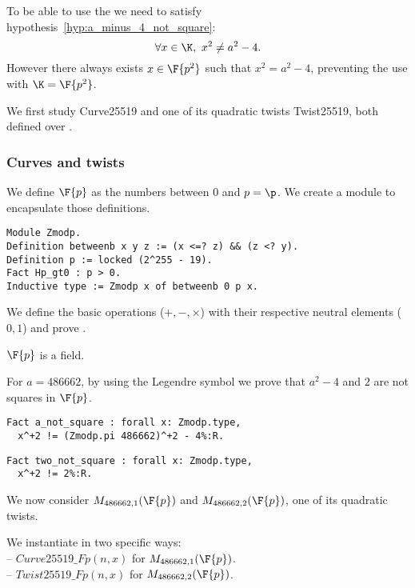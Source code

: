 To be able to use the  we need to satisfy
hypothesis~\ref{hyp:a_minus_4_not_square}:%
$$\forall x \in \K,\ x^2 \neq a^2-4.$$
However there always exists $x \in \F{p^2}$ such that $x^2 = a^2-4$,
preventing the use 
with $\K = \F{p^2}$.

\begin{sloppypar}
  We first study Curve25519 and one of its quadratic twists Twist25519,
  both defined over .
\end{sloppypar}

\subsubsection{Curves and twists}
\label{subsec:Zmodp}

We define $\F{p}$ as the numbers between $0$ and $p = \p$.
We create a  module to encapsulate those definitions.
\begin{lstlisting}[language=Coq]
Module Zmodp.
Definition betweenb x y z := (x <=? z) && (z <? y).
Definition p := locked (2^255 - 19).
Fact Hp_gt0 : p > 0.
Inductive type := Zmodp x of betweenb 0 p x.
\end{lstlisting}

We define the basic operations ($+, -, \times$) with their respective neutral
elements ($0, 1$) and prove .
\begin{lemma}
  \label{lemma:Zmodp_field}
  $\F{p}$ is a field.
\end{lemma}
For $a = 486662$, by using the Legendre symbol we prove that
$a^2 - 4$ and $2$ are not squares in $\F{p}$.
\begin{lstlisting}[language=Coq,belowskip=-0.25 \baselineskip]
Fact a_not_square : forall x: Zmodp.type,
  x^+2 != (Zmodp.pi 486662)^+2 - 4%:R.
\end{lstlisting}
\begin{lstlisting}[language=Coq,label=two_not_square,belowskip=-0.1 \baselineskip]
Fact two_not_square : forall x: Zmodp.type,
  x^+2 != 2%:R.
\end{lstlisting}
We now consider $M_{486662,1}(\F{p})$ and $M_{486662,2}(\F{p})$, one of its quadratic twists.
\begin{dfn}
  We instantiate  in two specific ways:\\
  -- $Curve25519\_Fp(n,x)$ for $M_{486662,1}(\F{p})$.\\
  -- $Twist25519\_Fp(n,x)$ for $M_{486662,2}(\F{p})$.
\end{dfn}

